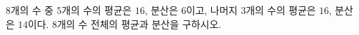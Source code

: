 $8$개의 수 중 $5$개의 수의 평균은 $16$, 분산은 $6$이고, 나머지 $3$개의 수의 평균은 $16$, 분산은 $14$이다. $8$개의 수 전체의 평균과 분산을 구하시오.
